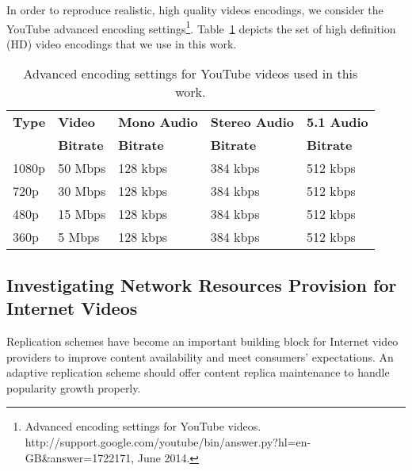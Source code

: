 In order to reproduce realistic, high quality videos encodings, we consider the YouTube advanced encoding settings\footnote{Advanced encoding settings for YouTube videos. http://support.google.com/youtube/bin/answer.py?hl=en-GB\&answer=1722171, June 2014.}. Table~\ref{tab:youtube_encodings} depicts the set of high definition (HD) video encodings that we use in this work. 

\begin{table}
  \label{tab:motivation_advanced_encodings}
	\begin{center}
		\caption{Advanced encoding settings for YouTube videos used in this work.}
  		\label{tab:youtube_encodings}
		\begin{tabular}{p{1.1cm}||p{1.7cm} p{2.5cm} p{2.5cm} p{2cm}}
			{\bf Type}&{\bf Video}&{\bf Mono Audio}&{\bf Stereo Audio}&{\bf 5.1 Audio}\\
			&{\bf Bitrate}&{\bf Bitrate}&{\bf Bitrate}&{\bf Bitrate}\\
			\hline
			\hline
			1080p&50 Mbps&128 kbps&384 kbps&512 kbps\\
			720p&30 Mbps&128 kbps&384 kbps&512 kbps\\
			480p&15 Mbps&128 kbps&384 kbps&512 kbps\\
			360p&5 Mbps&128 kbps&384 kbps&512 kbps\\
		\end{tabular}
	\end{center}
\end{table}

\subsection{Investigating Network Resources Provision for Internet Videos}



Replication schemes have become an important building block for Internet video providers to improve content availability and meet consumers' expectations. 
An adaptive replication scheme should offer content replica maintenance to handle popularity growth properly.

